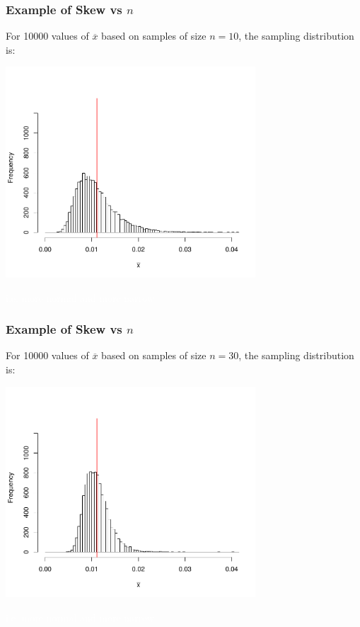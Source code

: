 \documentclass[handout]{beamer}
\newcommand{\blue}[1]{\textcolor{blue2}{#1}}
\newcommand{\white}[1]{\textcolor{white}{#1}}
\newcommand{\xbar}{\overline{x}}
\begin{document}
\begin{frame}
\frametitle{Example of Skew vs $n$}
For 10000 values of $\xbar$ based on samples of size \blue{$n=10$}, the sampling distribution is:
\begin{center}
\includegraphics[width=0.7\textwidth]{figure/hist10.pdf}
\end{center}
\white{i.e. more normal and more narrow}
\end{frame}


\begin{frame}
\frametitle{Example of Skew vs $n$}
For 10000 values of $\xbar$ based on samples of size \blue{$n=30$}, the sampling distribution is:
\begin{center}
\includegraphics[width=0.7\textwidth]{figure/hist30.pdf}
\end{center}
\white{i.e. more normal and more narrow}
\end{frame}
\end{document}
